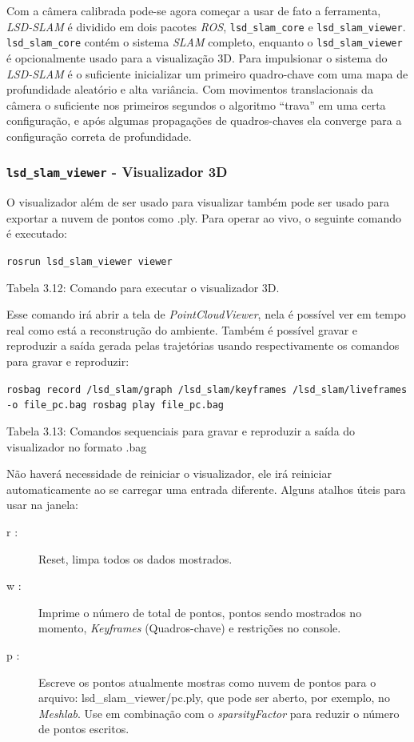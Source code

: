Com a câmera calibrada pode-se agora começar a usar de fato a ferramenta, \textit{LSD-SLAM} é dividido em dois pacotes \textit{ROS}, \texttt{lsd\_slam\_core} e \texttt{lsd\_slam\_viewer}. \texttt{lsd\_slam\_core} contém o sistema \textit{SLAM} completo, enquanto o \texttt{lsd\_slam\_viewer} é opcionalmente usado para a visualização 3D.
Para impulsionar o sistema do \textit{LSD-SLAM} é o suficiente inicializar um primeiro quadro-chave com uma mapa de profundidade aleatório e alta variância. Com movimentos translacionais da câmera o suficiente nos primeiros segundos o algoritmo “trava” em uma certa configuração, e após algumas propagações de quadros-chaves ela converge para a configuração correta de profundidade.

\subsubsection{\texttt{lsd\_slam\_viewer} - Visualizador 3D}

O visualizador além de ser usado para visualizar também pode ser usado para exportar a nuvem de pontos como .ply. Para operar ao vivo, o seguinte comando é executado:

\texttt{rosrun lsd\_slam\_viewer viewer}

Tabela 3.12: Comando para executar o visualizador 3D.

Esse comando irá abrir a tela de \textit{PointCloudViewer}, nela é possível ver em tempo real como está a reconstrução do ambiente. Também é possível gravar e reproduzir a saída gerada pelas trajetórias usando respectivamente os comandos para gravar e reproduzir:

\texttt{rosbag record /lsd\_slam/graph /lsd\_slam/keyframes /lsd\_slam/liveframes -o file\_pc.bag
rosbag play file\_pc.bag}

Tabela 3.13: Comandos sequenciais para gravar e reproduzir a saída do visualizador no formato .bag

Não haverá necessidade de reiniciar o visualizador, ele irá reiniciar automaticamente ao se carregar uma entrada diferente. Alguns atalhos úteis para usar na janela:

\begin{description}
	\item[r :]{Reset, limpa todos os dados mostrados.}
	\item[w :]{Imprime o número de total de pontos, pontos sendo mostrados no momento, \textit{Keyframes} (Quadros-chave) e restrições no console.}
	\item[p :]{Escreve os pontos atualmente mostras como nuvem de pontos para o arquivo: lsd\_slam\_viewer/pc.ply, que pode ser aberto, por exemplo, no \textit{Meshlab}. Use  em combinação com o \textit{sparsityFactor}  para reduzir o número de pontos escritos.}
\end{description}	

